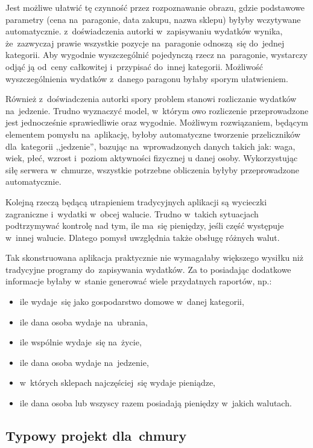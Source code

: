 \documentclass[12pt,a4paper,twoside,titlepage,openright]{book}
\begin{document}
Jest możliwe ułatwić tę czynność przez rozpoznawanie obrazu, gdzie podstawowe parametry (cena na~paragonie, data zakupu, nazwa sklepu) byłyby wczytywane automatycznie. z~doświadczenia autorki w~zapisywaniu wydatków wynika, że~zazwyczaj prawie wszystkie pozycje na~paragonie odnoszą~się do~jednej kategorii. Aby wygodnie wyszczególnić pojedynczą rzecz na~paragonie, wystarczy odjąć ją od~ceny całkowitej i~przypisać do~innej kategorii. Możliwość wyszczególnienia wydatków z~danego paragonu byłaby sporym ułatwieniem.

Również z~doświadczenia autorki spory problem stanowi rozliczanie wydatków na~jedzenie. Trudno wyznaczyć model, w~którym owo rozliczenie przeprowadzone jest jednocześnie sprawiedliwie oraz wygodnie. Możliwym rozwiązaniem, będącym elementem pomysłu na~aplikację, byłoby automatyczne tworzenie przeliczników dla~kategorii ,,jedzenie'', bazując na~wprowadzonych danych takich jak: waga, wiek, płeć, wzrost i~poziom aktywności fizycznej u danej osoby. Wykorzystując siłę serwera w~chmurze, wszystkie potrzebne obliczenia byłyby przeprowadzone automatycznie.

Kolejną rzeczą będącą utrapieniem tradycyjnych aplikacji są wycieczki zagraniczne i~wydatki w~obcej walucie. Trudno w~takich sytuacjach podtrzymywać kontrolę nad tym, ile ma~się pieniędzy, jeśli część występuje w~innej walucie. Dlatego pomysł uwzględnia także obsługę różnych walut.

Tak skonstruowana aplikacja praktycznie nie wymagałaby większego wysiłku niż tradycyjne programy do~zapisywania wydatków. Za to posiadając dodatkowe informacje byłaby w~stanie generować wiele przydatnych raportów, np.:
\begin{itemize}
\item ile wydaje~się jako gospodarstwo domowe w~danej kategorii,
\item ile dana osoba wydaje na~ubrania,
\item ile wspólnie wydaje~się na~życie,
\item ile dana osoba wydaje na~jedzenie,
\item w~których sklepach najczęściej~się wydaje pieniądze,
\item ile dana osoba lub wszyscy razem posiadają pieniędzy w~jakich walutach.
\end{itemize}

\subsection{Typowy projekt dla~chmury}
\end{document}
